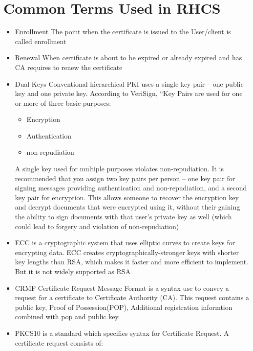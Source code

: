 \documentclass[12pt]{report}
\begin{document}
\section{Common Terms Used in RHCS}
\begin{itemize}
    \item Enrollment
        The point when the certificate is issued to the User/client is called enrollment
    \item Renewal
        When certificate is about to be expired or already expired and has CA requires to 
        renew the certificate
    \item Dual Keys
        Conventional hierarchical PKI uses a single key pair – one public key and one
        private key. According to VeriSign, “Key Pairs are used for one or more of three basic purposes:
        \begin{itemize}
            \item Encryption
            \item Authentication
            \item non-repudiation
        \end{itemize}
         A single key used for multiple purposes violates non-repudiation.
         It is recommended that you assign two key pairs per person -- one key pair for signing messages 
         providing authentication and non-repudiation, and a second key pair for encryption. 
         This allows someone to recover the encryption key and decrypt documents that were encrypted using it,
         without their gaining the ability to sign documents with that user’s private key as well (which
         could lead to forgery and violation of non-repudiation)
    \item ECC
        is a cryptographic system that uses elliptic curves to create keys for encrypting data. 
        ECC creates cryptographically-stronger keys with shorter key lengths  than RSA, which makes it faster 
        and more efficient to implement. But it is not widely supported as RSA
    \item CRMF
        Certificate Request Message Format is a syntax use to convey a request for a certificate to Certificate
        Authority (CA). This request contains a public key, Proof of Possession(POP), Additional registration informtion
        combined with pop and public key.\cite{4211}
    \item PKCS10 
        is a standard which specifies syntax for Certificate Request. A certificate request consists of: ~\cite{2986}
        \begin{itemize}

\end{itemize}
\end{itemize}
\end{document}
